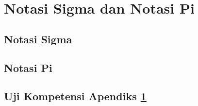 \chapter{Notasi Sigma dan Notasi Pi}
\label{sec:first-app}
\kant[20-21] %
\section{Notasi Sigma}
\kant[22]    %
\section{Notasi Pi}
\kant[23-24] %
\section{Uji Kompetensi Apendiks \ref{sec:first-app}}
\kant[11-13]